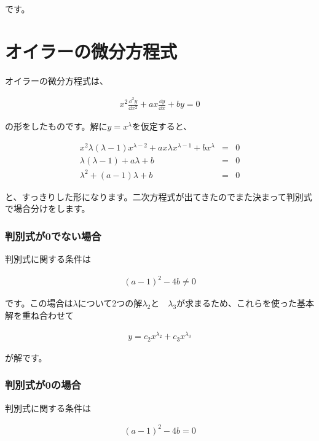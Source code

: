 \noindent
です。









\section{オイラーの微分方程式}
\label{euler}
オイラーの微分方程式は、

\begin{eqnarray}
    x^2\frac{\dd^2 y}{\dd x^2}+ax\frac{\dd y}{\dd x}+by=0
    \label{eq:euler}
\end{eqnarray}

\noindent
の形をしたものです。解に$y=x^\lambda$を仮定すると、

\begin{eqnarray}
    x^2\lambda(\lambda-1)x^{\lambda-2}+ax\lambda x^{\lambda-1}+bx^\lambda&=&0 \\
    \lambda(\lambda-1)+a\lambda+b&=&0 \nonumber \\
    \lambda^2+(a-1)\lambda+b&=&0
    \label{eq:euler-characteristic}
\end{eqnarray}

\noindent
と、すっきりした形になります。二次方程式が出てきたのでまた決まって判別式で場合分けをします。

\subsubsection{判別式が0でない場合}
判別式に関する条件は

\begin{eqnarray}
    (a-1)^2-4b\neq0
\end{eqnarray}

\noindent
です。この場合は$\lambda$について2つの解$\lambda_2$と　$\lambda_3$が求まるため、これらを使った基本解を重ね合わせて

\begin{eqnarray}
    y=c_2x^{\lambda_2}+c_3x^{\lambda_3}
\end{eqnarray}

\noindent
が解です。

\subsubsection{判別式が0の場合}
判別式に関する条件は

\begin{eqnarray}
    (a-1)^2-4b=0
\end{eqnarray}

